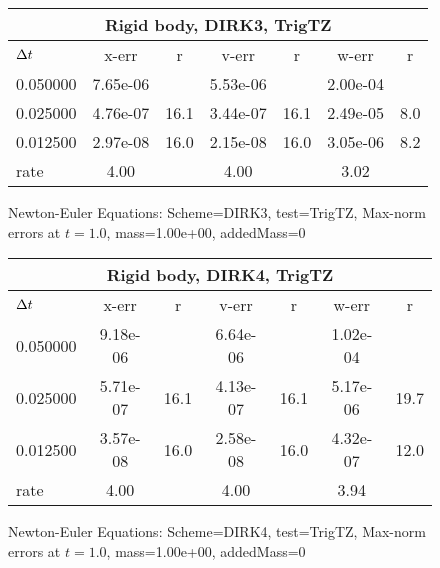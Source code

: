 \begin{figure}[hbt]\tableFont %
\begin{center}
\begin{tabular}{|l|c|c|c|c|c|c|} \hline 
\multicolumn{7}{|c|}{Rigid body, DIRK3, TrigTZ}     \\ \hline
${\Delta t}$    &  x-err   &   r   &  v-err   &   r   &  w-err   &   r   \\ \hline
0.050000 & 7.65e-06 &       & 5.53e-06 &       & 2.00e-04 &         \\ \hline
0.025000 & 4.76e-07 & 16.1  & 3.44e-07 & 16.1  & 2.49e-05 &  8.0    \\ \hline
0.012500 & 2.97e-08 & 16.0  & 2.15e-08 & 16.0  & 3.05e-06 &  8.2    \\ \hline
 rate    &  4.00   &       &  4.00   &       &  3.02   &          \\ \hline
\end{tabular}
\caption{Newton-Euler Equations: Scheme=DIRK3, test=TrigTZ, Max-norm errors at $t= 1.0$, mass=1.00e+00, addedMass=0 }
\label{tab:TestTrigTZ_SchemeDIRK3}
\end{center}
\end{figure} 
\begin{figure}[hbt]\tableFont %
\begin{center}
\begin{tabular}{|l|c|c|c|c|c|c|} \hline 
\multicolumn{7}{|c|}{Rigid body, DIRK4, TrigTZ}     \\ \hline
${\Delta t}$    &  x-err   &   r   &  v-err   &   r   &  w-err   &   r   \\ \hline
0.050000 & 9.18e-06 &       & 6.64e-06 &       & 1.02e-04 &         \\ \hline
0.025000 & 5.71e-07 & 16.1  & 4.13e-07 & 16.1  & 5.17e-06 & 19.7    \\ \hline
0.012500 & 3.57e-08 & 16.0  & 2.58e-08 & 16.0  & 4.32e-07 & 12.0    \\ \hline
 rate    &  4.00   &       &  4.00   &       &  3.94   &          \\ \hline
\end{tabular}
\caption{Newton-Euler Equations: Scheme=DIRK4, test=TrigTZ, Max-norm errors at $t= 1.0$, mass=1.00e+00, addedMass=0 }
\label{tab:TestTrigTZ_SchemeDIRK4}
\end{center}
\end{figure} 

